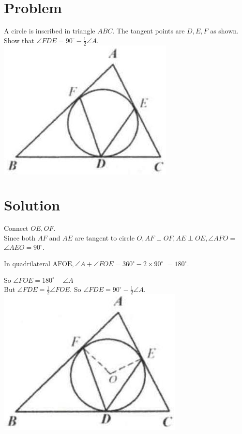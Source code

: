 \documentclass{article}
\begin{document}
\section*{Problem}
A circle is inscribed in triangle \(A B C\). The tangent points are \(D, E, F\) as shown. Show that \(\angle F D E=90^{\circ}-\frac{1}{2} \angle A\).\\
\centering
\includegraphics[width=\textwidth]{images/154(1).jpg}

\section*{Solution}
Connect \(O E, O F\).\\
Since both \(A F\) and \(A E\) are tangent to circle \(O, A F \perp O F, A E \perp O E, \angle A F O=\) \(\angle A E O=90^{\circ}\).

In quadrilateral \(\mathrm{AFOE}, \angle A+\angle F O E=360^{\circ}-2 \times 90^{\circ}\) \(=180^{\circ}\).

So \(\angle F O E=180^{\circ}-\angle A\)\\
But \(\angle F D E=\frac{1}{2} \angle F O E\). So \(\angle F D E=90^{\circ}-\frac{1}{2} \angle A\).\\
\centering
\includegraphics[width=\textwidth]{images/157(2).jpg}
\end{document}
